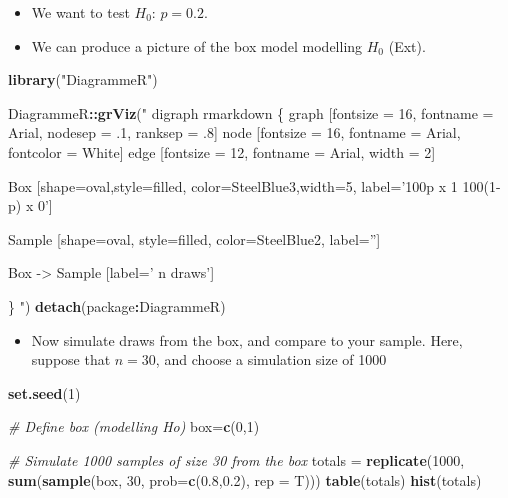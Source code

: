 \documentclass[]{article}
\newenvironment{Shaded}{\begin{snugshade}}{\end{snugshade}}
\newcommand{\CommentTok}[1]{\textcolor[rgb]{0.56,0.35,0.01}{\textit{#1}}}
\newcommand{\DataTypeTok}[1]{\textcolor[rgb]{0.13,0.29,0.53}{#1}}
\newcommand{\DecValTok}[1]{\textcolor[rgb]{0.00,0.00,0.81}{#1}}
\newcommand{\FloatTok}[1]{\textcolor[rgb]{0.00,0.00,0.81}{#1}}
\newcommand{\KeywordTok}[1]{\textcolor[rgb]{0.13,0.29,0.53}{\textbf{#1}}}
\newcommand{\NormalTok}[1]{#1}
\newcommand{\OperatorTok}[1]{\textcolor[rgb]{0.81,0.36,0.00}{\textbf{#1}}}
\newcommand{\StringTok}[1]{\textcolor[rgb]{0.31,0.60,0.02}{#1}}
\providecommand{\tightlist}{%
  \setlength{\itemsep}{0pt}\setlength{\parskip}{0pt}}
\begin{document}
\begin{itemize}
\item
  We want to test \(H_{0}\): \(p = 0.2\).
\item
  We can produce a picture of the box model modelling \(H_{0}\) (Ext).
\end{itemize}

\begin{Shaded}
\begin{Highlighting}[]
\KeywordTok{library}\NormalTok{(}\StringTok{"DiagrammeR"}\NormalTok{)}
  
\NormalTok{DiagrammeR}\OperatorTok{::}\KeywordTok{grViz}\NormalTok{(}\StringTok{" }
\StringTok{digraph rmarkdown \{}
\StringTok{  }
\StringTok{graph [fontsize = 16, fontname = Arial, nodesep = .1, ranksep = .8]}
\StringTok{node [fontsize = 16, fontname = Arial, fontcolor = White]}
\StringTok{edge [fontsize = 12, fontname = Arial, width = 2]}

\StringTok{Box [shape=oval,style=filled, color=SteelBlue3,width=5, label='100p x 1    100(1-p) x 0']}

\StringTok{Sample [shape=oval, style=filled, color=SteelBlue2, label='']}

\StringTok{Box -> Sample [label='   n draws']}

\StringTok{\}}
\StringTok{"}\NormalTok{)}
\KeywordTok{detach}\NormalTok{(package}\OperatorTok{:}\NormalTok{DiagrammeR)}
\end{Highlighting}
\end{Shaded}

\begin{itemize}
\tightlist
\item
  Now simulate draws from the box, and compare to your sample. Here, suppose that \(n=30\), and choose a simulation size of 1000
\end{itemize}

\begin{Shaded}
\begin{Highlighting}[]
\KeywordTok{set.seed}\NormalTok{(}\DecValTok{1}\NormalTok{)}

\CommentTok{# Define box (modelling Ho)}
\NormalTok{box=}\KeywordTok{c}\NormalTok{(}\DecValTok{0}\NormalTok{,}\DecValTok{1}\NormalTok{)}

\CommentTok{# Simulate 1000 samples of size 30 from the box}
\NormalTok{totals =}\StringTok{ }\KeywordTok{replicate}\NormalTok{(}\DecValTok{1000}\NormalTok{, }\KeywordTok{sum}\NormalTok{(}\KeywordTok{sample}\NormalTok{(box, }\DecValTok{30}\NormalTok{, }\DataTypeTok{prob=}\KeywordTok{c}\NormalTok{(}\FloatTok{0.8}\NormalTok{,}\FloatTok{0.2}\NormalTok{), }\DataTypeTok{rep =}\NormalTok{ T)))}
\KeywordTok{table}\NormalTok{(totals)}
\KeywordTok{hist}\NormalTok{(totals)}
\end{Highlighting}
\end{Shaded}
\end{document}
